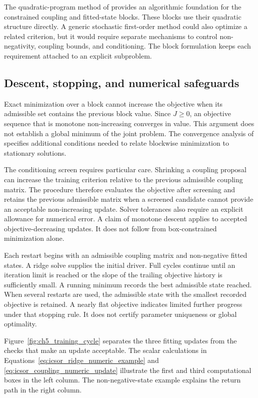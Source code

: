 The quadratic-program method of \citet{Stellato2018} provides an algorithmic foundation for the constrained coupling and fitted-state blocks. These blocks use their quadratic structure directly. A generic stochastic first-order method could also optimize a related criterion, but it would require separate mechanisms to control non-negativity, coupling bounds, and conditioning. The block formulation keeps each requirement attached to an explicit subproblem.

\subsection{Descent, stopping, and numerical safeguards}

Exact minimization over a block cannot increase the objective when its admissible set contains the previous block value. Since \(J\geq0\), an objective sequence that is monotone non-increasing converges in value. This argument does not establish a global minimum of the joint problem. The convergence analysis of \citet{Razaviyayn2013} specifies additional conditions needed to relate blockwise minimization to stationary solutions.

The conditioning screen requires particular care. Shrinking a coupling proposal can increase the training criterion relative to the previous admissible coupling matrix. The procedure therefore evaluates the objective after screening and retains the previous admissible matrix when a screened candidate cannot provide an acceptable non-increasing update. Solver tolerances also require an explicit allowance for numerical error. A claim of monotone descent applies to accepted objective-decreasing updates. It does not follow from box-constrained minimization alone.

Each restart begins with an admissible coupling matrix and non-negative fitted states. A ridge solve supplies the initial driver. Full cycles continue until an iteration limit is reached or the slope of the trailing objective history is sufficiently small. A running minimum records the best admissible state reached. When several restarts are used, the admissible state with the smallest recorded objective is retained. A nearly flat objective indicates limited further progress under that stopping rule. It does not certify parameter uniqueness or global optimality.

Figure~\ref{fig:ch5_training_cycle} separates the three fitting updates from the checks that make an update acceptable. The scalar calculations in Equations~\eqref{eq:icsor_ridge_numeric_example} and \eqref{eq:icsor_coupling_numeric_update} illustrate the first and third computational boxes in the left column. The non-negative-state example explains the return path in the right column.

